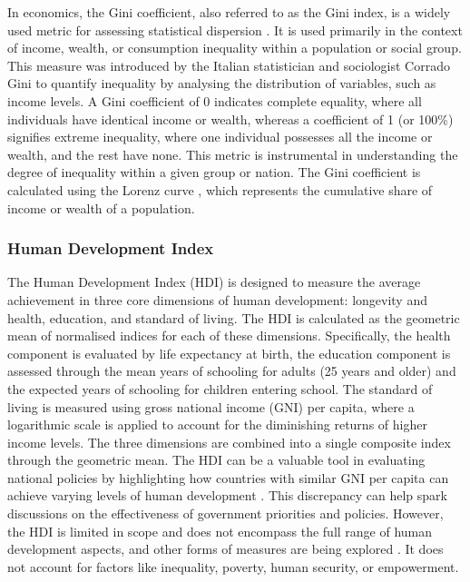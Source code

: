 In economics, the Gini coefficient, also referred to as the Gini index, is a widely used metric for assessing statistical dispersion \cite{lerman1984note}. It is used primarily in the context of income, wealth, or consumption inequality within a population or social group. This measure was introduced by the Italian statistician and sociologist Corrado Gini \cite{Ceriani2012} to quantify inequality by analysing the distribution of variables, such as income levels. A Gini coefficient of 0 indicates complete equality, where all individuals have identical income or wealth, whereas a coefficient of 1 (or 100\%) signifies extreme inequality, where one individual possesses all the income or wealth, and the rest have none. This metric is instrumental in understanding the degree of inequality within a given group or nation\cite{WorldBank_Gini}. The Gini coefficient is calculated using the Lorenz curve \cite{gastwirth1972estimation}, which represents the cumulative share of income or wealth of a population.  

\subsubsection{Human Development Index}

The Human Development Index (HDI) is designed to measure the average achievement in three core dimensions of human development: longevity and health, education, and standard of living. The HDI is calculated as the geometric mean of normalised indices for each of these dimensions. Specifically, the health component is evaluated by life expectancy at birth, the education component is assessed through the mean years of schooling for adults (25 years and older) and the expected years of schooling for children entering school. The standard of living is measured using gross national income (GNI) per capita, where a logarithmic scale is applied to account for the diminishing returns of higher income levels. The three dimensions are combined into a single composite index through the geometric mean. The HDI can be a valuable tool in evaluating national policies by highlighting how countries with similar GNI per capita can achieve varying levels of human development \cite{ivanova1999assessment}. This discrepancy can help spark discussions on the effectiveness of government priorities and policies. However, the HDI is limited in scope and does not encompass the full range of human development aspects, and other forms of measures are being explored \cite{comim2016beyond}. It does not account for factors like inequality, poverty, human security, or empowerment.